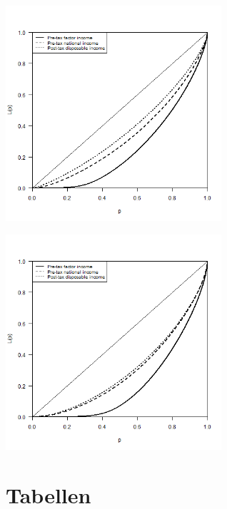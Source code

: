 \documentclass[12pt,]{article}
\let\origfigure\figure
\let\endorigfigure\endfigure
\renewenvironment{figure}[1][2] {
        \expandafter\origfigure\expandafter[H]
      } {\endorigfigure}
\begin{document}
\begin{figure}
\centering
\includegraphics[width=0.60000\textwidth]{img/Lorenzp1.png}
\caption{Lorenz Curve - Equal sharing}
\end{figure}

\begin{figure}
\centering
\includegraphics[width=0.60000\textwidth]{img/Lorenzp2.png}
\caption{Lorenz Curve - Partial sharing}
\end{figure}

\section{Tabellen}\label{tabellen}
\end{document}
